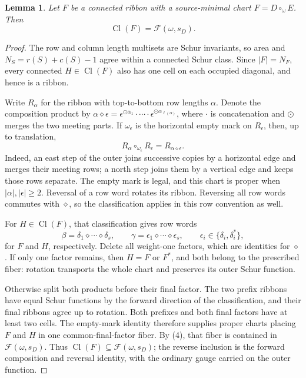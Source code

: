 \documentclass[11pt,a4paper]{amsart}
\numberwithin{equation}{section}
\theoremstyle{plain}
\newtheorem{lemma}[theorem]{Lemma}
\theoremstyle{definition}
\newcommand{\Cl}{\operatorname{Cl}}
\begin{document}
\begin{lemma}\label{lem:ribbon-fiber}
Let \(F\) be a connected ribbon with a source-minimal chart
\(F=D\circ_\omega E\).  Then
\[
 \Cl(F)=\mathcal F(\omega,s_D).
\]
\end{lemma}
\begin{proof}
The row and column length multisets are Schur invariants, so area and
\(N_S=r(S)+c(S)-1\) agree within a connected Schur class.  Since \(|F|=N_F\), every
connected \(H\in\Cl(F)\) also has one cell on each occupied diagonal,
and hence is a ribbon.

Write \(R_\alpha\) for the ribbon with top-to-bottom row lengths
\(\alpha\).  Denote the composition product by
\(\alpha\diamond\epsilon
=\epsilon^{\odot\alpha_1}\cdot\cdots\cdot
\epsilon^{\odot\alpha_{\ell(\alpha)}}\), where \(\cdot\) is
concatenation and \(\odot\) merges the two meeting parts.
If \(\omega_\epsilon\) is the horizontal empty mark on \(R_\epsilon\),
then, up to translation,
\[
 R_\alpha\circ_{\omega_\epsilon}R_\epsilon
 =R_{\alpha\diamond\epsilon}.
\]
Indeed, an east step of the outer joins successive copies by a horizontal
edge and merges their meeting rows; a north step joins them by a vertical
edge and keeps those rows separate.  The empty mark is legal, and this
chart is proper when \(|\alpha|,|\epsilon|\ge2\).
Reversal of a row word rotates its ribbon.  Reversing all row words
commutes with \(\diamond\), so the classification applies in this row
convention as well.

For \(H\in\Cl(F)\), that classification gives row words
\[
 \beta=\delta_1\diamond\cdots\diamond\delta_s,\qquad
 \gamma=\epsilon_1\diamond\cdots\diamond\epsilon_s,
 \qquad \epsilon_i\in\{\delta_i,\delta_i^*\},
\]
for \(F\) and \(H\), respectively.  Delete all weight-one factors,
which are identities for \(\diamond\).  If only one factor remains,
then \(H=F\) or \(F^*\), and both belong to the prescribed fiber:
rotation transports the whole chart and preserves its outer Schur
function.

Otherwise split both products before their final factor.  The two
prefix ribbons have equal Schur functions by the forward direction
of the classification, and their final ribbons agree up to rotation.
Both prefixes and both final factors have at least two cells.
The empty-mark identity therefore supplies proper charts placing
\(F\) and \(H\) in one common-final-factor fiber.  By
(4), that fiber is contained in
\(\mathcal F(\omega,s_D)\).  Thus
\(\Cl(F)\subseteq\mathcal F(\omega,s_D)\); the reverse inclusion is
the forward composition and reversal identity, with the ordinary
gauge carried on the outer function.
\end{proof}
\end{document}
